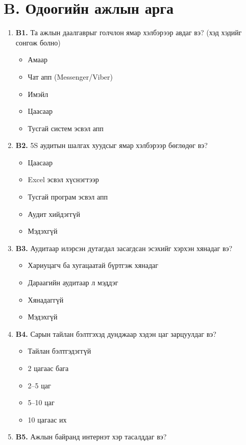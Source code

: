 \section*{B. Одоогийн ажлын арга}
\begin{enumerate}[label={}, leftmargin=0pt]
\item \textbf{B1.} Та ажлын даалгаврыг голчлон ямар хэлбэрээр авдаг вэ? (хэд хэдийг сонгож болно)
\begin{itemize}[label=$\square$]
  \item Амаар
  \item Чат апп (Messenger/Viber)
  \item Имэйл
  \item Цаасаар
  \item Тусгай систем эсвэл апп
\end{itemize}
\item \textbf{B2.} 5S аудитын шалгах хуудсыг ямар хэлбэрээр бөглөдөг вэ?
\begin{itemize}[label=$\square$]
  \item Цаасаар
  \item Excel эсвэл хүснэгтээр
  \item Тусгай програм эсвэл апп
  \item Аудит хийдэггүй
  \item Мэдэхгүй
\end{itemize}
\item \textbf{B3.} Аудитаар илэрсэн дутагдал засагдсан эсэхийг хэрхэн хянадаг вэ?
\begin{itemize}[label=$\square$]
  \item Хариуцагч ба хугацаатай бүртгэж хянадаг
  \item Дараагийн аудитаар л мэддэг
  \item Хянадаггүй
  \item Мэдэхгүй
\end{itemize}
\item \textbf{B4.} Сарын тайлан бэлтгэхэд дунджаар хэдэн цаг зарцуулдаг вэ?
\begin{itemize}[label=$\square$]
  \item Тайлан бэлтгэдэггүй
  \item 2 цагаас бага
  \item 2--5 цаг
  \item 5--10 цаг
  \item 10 цагаас их
\end{itemize}
\item \textbf{B5.} Ажлын байранд интернэт хэр тасалддаг вэ?
\begin{itemize}[label=$\square$]

\end{itemize}
\end{enumerate}
